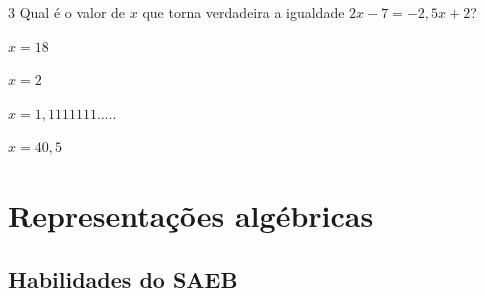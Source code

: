 





\num{3} Qual é o valor de $x$ que torna verdadeira a igualdade $2x - 7 = -2,5x + 2$?

\begin{escolha}[itemsep=0pt]
\item $x = 18$
\item $x = 2$
\item $x = 1,1111111.\ldots.$
\item $x = 40,5$
\end{escolha}











\chapter{Representações algébricas}

\section*{Habilidades do SAEB }

